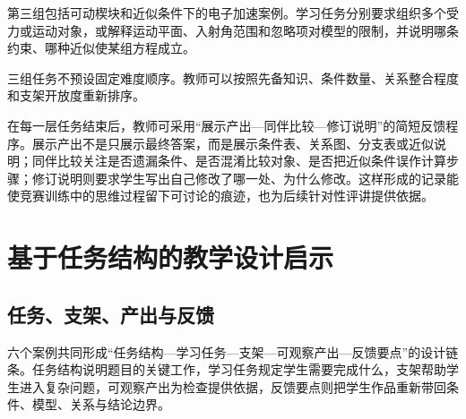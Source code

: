 \documentclass[
  12pt,
  a4paper,twoside,openany]{ctexbook}
\begin{document}
第三组包括可动楔块和近似条件下的电子加速案例。学习任务分别要求组织多个受力或运动对象，或解释运动平面、入射角范围和忽略项对模型的限制，并说明哪条约束、哪种近似使某组方程成立。

三组任务不预设固定难度顺序。教师可以按照先备知识、条件数量、关系整合程度和支架开放度重新排序。

在每一层任务结束后，教师可采用``展示产出---同伴比较---修订说明''的简短反馈程序。展示产出不是只展示最终答案，而是展示条件表、关系图、分支表或近似说明；同伴比较关注是否遗漏条件、是否混淆比较对象、是否把近似条件误作计算步骤；修订说明则要求学生写出自己修改了哪一处、为什么修改。这样形成的记录能使竞赛训练中的思维过程留下可讨论的痕迹，也为后续针对性评讲提供依据。

\section{基于任务结构的教学设计启示}\label{ux57faux4e8eux4efbux52a1ux7ed3ux6784ux7684ux6559ux5b66ux8bbeux8ba1ux542fux793a}

\subsection{任务、支架、产出与反馈}\label{ux4efbux52a1ux652fux67b6ux4ea7ux51faux4e0eux53cdux9988}

六个案例共同形成``任务结构---学习任务---支架---可观察产出---反馈要点''的设计链条。任务结构说明题目的关键工作，学习任务规定学生需要完成什么，支架帮助学生进入复杂问题，可观察产出为检查提供依据，反馈要点则把学生作品重新带回条件、模型、关系与结论边界。
\end{document}
